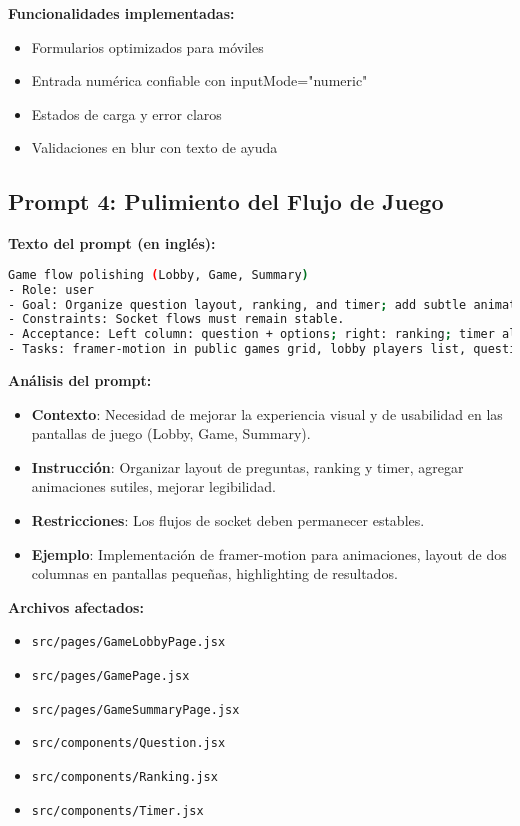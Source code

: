 \documentclass[12pt,a4paper]{article}
\begin{document}
\textbf{Funcionalidades implementadas:}
\begin{itemize}
    \item Formularios optimizados para móviles
    \item Entrada numérica confiable con inputMode="numeric"
    \item Estados de carga y error claros
    \item Validaciones en blur con texto de ayuda
\end{itemize}

\subsection{Prompt 4: Pulimiento del Flujo de Juego}

\textbf{Texto del prompt (en inglés):}
\begin{lstlisting}[language=bash]
Game flow polishing (Lobby, Game, Summary)
- Role: user
- Goal: Organize question layout, ranking, and timer; add subtle animations; improve readability.
- Constraints: Socket flows must remain stable.
- Acceptance: Left column: question + options; right: ranking; timer aligned; animations for lists and options; stacked options on small screens.
- Tasks: framer-motion in public games grid, lobby players list, question options; two-column options on `sm:`; result highlighting (correct/incorrect).
\end{lstlisting}

\textbf{Análisis del prompt:}
\begin{itemize}
    \item \textbf{Contexto}: Necesidad de mejorar la experiencia visual y de usabilidad en las pantallas de juego (Lobby, Game, Summary).
    \item \textbf{Instrucción}: Organizar layout de preguntas, ranking y timer, agregar animaciones sutiles, mejorar legibilidad.
    \item \textbf{Restricciones}: Los flujos de socket deben permanecer estables.
    \item \textbf{Ejemplo}: Implementación de framer-motion para animaciones, layout de dos columnas en pantallas pequeñas, highlighting de resultados.
\end{itemize}

\textbf{Archivos afectados:}
\begin{itemize}
    \item \texttt{src/pages/GameLobbyPage.jsx}
    \item \texttt{src/pages/GamePage.jsx}
    \item \texttt{src/pages/GameSummaryPage.jsx}
    \item \texttt{src/components/Question.jsx}
    \item \texttt{src/components/Ranking.jsx}
    \item \texttt{src/components/Timer.jsx}
\end{itemize}
\end{document}
